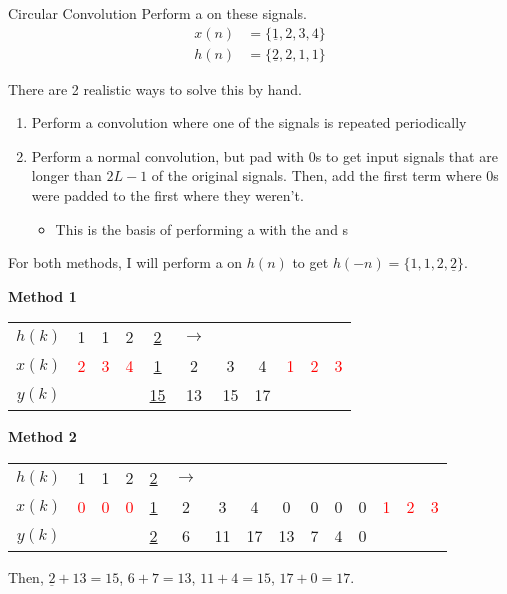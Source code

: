 \begin{example}{Circular Convolution}
  Perform a  on these signals.
  \begin{align*}
    x(n) &= \lbrace \underline{1}, 2, 3, 4 \rbrace \\
    h(n) &= \lbrace \underline{2}, 2, 1, 1 \rbrace
  \end{align*}

  \tcblower{}

  There are 2 realistic ways to solve this by hand.
  \begin{enumerate}[noitemsep]
  \item Perform a convolution where one of the signals is repeated periodically
  \item Perform a normal convolution, but pad with 0s to get input signals that are longer than $2L-1$ of the original signals. Then, add the first term where 0s were padded to the first where they weren't.
    \begin{itemize}[noitemsep]
    \item This is the basis of performing a  with the  and s
    \end{itemize}
  \end{enumerate}

  For both methods, I will perform a  on $h(n)$ to get $h(-n) = \lbrace 1, 1, 2, \underline{2} \rbrace$.

  \textbf{Method 1} \\
  \begin{center}
    \begin{tabular}{ccccccccccc}
      \toprule
      $h(k)$ & 1 & 1 & 2 & \underline{2} & $\rightarrow$ & & & & & \\
      $x(k)$ & \textcolor{red}{2} & \textcolor{red}{3} & \textcolor{red}{4} & \underline{1} & 2 & 3 & 4 & \textcolor{red}{1} & \textcolor{red}{2} & \textcolor{red}{3} \\
      \midrule
      $y(k)$ & & & & \underline{15} & 13 & 15 & 17 & & \\
      \bottomrule
    \end{tabular}
  \end{center}

  \textbf{Method 2}
  \begin{center}
    \begin{tabular}{ccccccccccccccc}
      \toprule
      $h(k)$ & 1 & 1 & 2 & \underline{2} & $\rightarrow$ & & & & & & & & & \\
      $x(k)$ & \textcolor{red}{0} & \textcolor{red}{0} & \textcolor{red}{0} & \underline{1} & 2 & 3 & 4 & 0 & 0 & 0 & 0 & \textcolor{red}{1} & \textcolor{red}{2} & \textcolor{red}{3} \\
      \midrule
      $y(k)$ & & & & \underline{2} & 6 & 11 & 17 & 13 & 7 & 4 & 0 & & & \\
      \bottomrule
    \end{tabular}
  \end{center}
  Then, $\underline{2} + 13 = 15$, $6 + 7 = 13$, $11 + 4 = 15$, $17 + 0 = 17$.
  \newline


\end{example}
